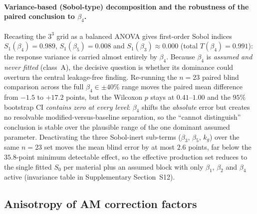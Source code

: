 \paragraph{Variance-based (Sobol-type) decomposition and the robustness of the paired conclusion to $\beta_4$.} Recasting the $3^3$ grid as a balanced ANOVA gives first-order Sobol indices $S_1(\beta_4) = 0.989$, $S_1(\beta_5) = 0.008$ and $S_1(\beta_3) \approx 0.000$ (total $T(\beta_4) = 0.991$): the response variance is carried almost entirely by $\beta_4$. Because $\beta_4$ is \emph{assumed and never fitted} (class~A), the decisive question is whether its dominance could overturn the central leakage-free finding. Re-running the $n = 23$ paired blind comparison across the full $\beta_4 \in \pm 40\%$ range moves the paired mean difference from $-1.5$ to $+17.2$ points, but the Wilcoxon $p$ stays at $0.41$--$1.00$ and the $95\%$ bootstrap CI \emph{contains zero at every level}: $\beta_4$ shifts the \emph{absolute} error but creates no resolvable modified-versus-baseline separation, so the ``cannot distinguish'' conclusion is stable over the plausible range of the one dominant assumed parameter. Deactivating the three Sobol-inert sub-terms ($\beta_3$, $\beta_5$, $k_g$) over the same $n = 23$ set moves the mean blind error by at most $2.6$ points, far below the $35.8$-point minimum detectable effect, so the effective production set reduces to the single fitted $S_0$ per material plus an assumed block with only $\beta_1$, $\beta_2$ and $\beta_4$ active (invariance table in Supplementary Section~S12).

\subsection{Anisotropy of AM correction factors}
\label{sec:aniso_factors}

